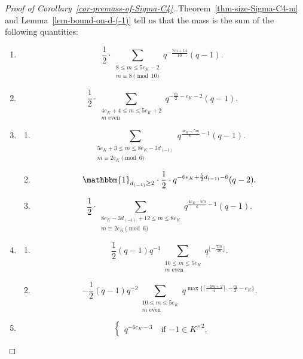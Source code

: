 \documentclass[11pt]{amsart}
\theoremstyle{theorem}
\theoremstyle{example}
\theoremstyle{definition}
\numberwithin{theorem}{section}
\numberwithin{theorem}{section}
\begin{document}
\begin{proof}[Proof of Corollary~\ref{cor-premass-of-Sigma-C4}]
    Theorem~\ref{thm-size-Sigma-C4-m} and Lemma~\ref{lem-bound-on-d-(-1)} tell us that the mass is the sum of the following quantities:
    \begin{enumerate}
        \item  $$\frac{1}{2}\cdot \sum_{\substack{8 \leq m \leq 5e_K - 2 \\ m \equiv 8\pmod{10}}} q^{-\frac{7m + 14}{10}}(q-1).$$
        \item $$
                \frac{1}{2}\cdot \sum_{\substack{
                    4e_K + 4 \leq m \leq 5e_K + 2
                    \\
                    \text{$m$ even}
                }} q^{-\frac{m}{2} - e_K - 2}(q-1).
            $$
        \item \begin{enumerate}
            \item $$
                \sum_{\substack{5e_K + 3 \leq m \leq 8e_K - 3d_{(-1)} \\ m \equiv 2e_K \pmod{6}}} q^{\frac{4e_K-5m}{6} - 1}(q-1). 
            $$
            \item $$
                \mathbbm{1}_{d_{(-1)} \geq 2}\cdot \frac{1}{2}\cdot q^{-6e_K + \frac{5}{2}d_{(-1)} - 6}(q-2).     
            $$
            \item $$
                \frac{1}{2}\cdot \sum_{\substack{8e_K - 3d_{(-1)} + 12 \leq m \leq 8e_K \\ m\equiv 2e_K\pmod{6}}}  q^{\frac{4e_K-5m}{6} - 1}(q-1).   
            $$
        \end{enumerate}
        \item \begin{enumerate}
            \item $$
            \frac{1}{2} (q-1)q^{-1}\sum_{\substack{10 \leq m \leq 5e_K \\ \text{$m$ even}}} q^{\lfloor-\frac{7m}{10}\rfloor
                }. 
            $$
            \item $$
            - \frac{1}{2} (q-1)q^{-2}\sum_{\substack{10 \leq m \leq 5e_K \\ \text{$m$ even}}} q^{\max\{
                \lceil \frac{-3m+2}{4}\rceil,
                -\frac{m}{2} - e_K
            \}}.
            $$
        \end{enumerate}
        \item $$
        \begin{cases}
            q^{-6e_K - 3} \quad\text{if $-1 \in K^{\times 2}$},

\end{cases}$$
\end{enumerate}
\end{proof}
\end{document}
